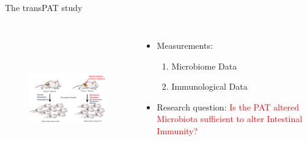 \documentclass[a4paper,9pt]{beamer}
\begin{document}
\subsection{}
\begin{frame}{\huge{The transPAT study}}
\begin{columns}
\begin{figure}[H]
\includegraphics[scale=0.7,height=5.8cm,width=7cm]{rat.PNG}
\end{figure}
\vspace{0.3in}
\begin{itemize}
\item Measurements:
\begin{enumerate}
\small
\item Microbiome Data
\item Immunological Data
\end{enumerate}
\vspace{0.3in}
\item Research question:
\textcolor{red}{Is the PAT altered Microbiota sufficient to alter Intestinal Immunity?}
\end{itemize}

\end{columns}
\end{frame}
\end{document}

